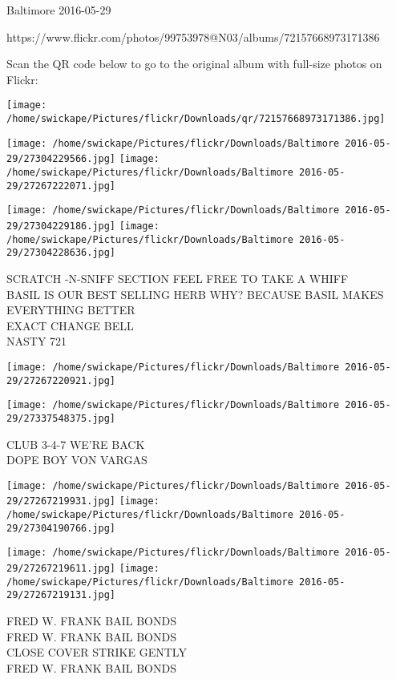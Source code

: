 \documentclass[10pt,letterpaper]{article}
\begin{document}
Baltimore 2016-05-29

https://www.flickr.com/photos/99753978@N03/albums/72157668973171386

Scan the QR code below to go to the original album with full-size photos on Flickr:

\texttt{[image: /home/swickape/Pictures/flickr/Downloads/qr/72157668973171386.jpg]}
\pagebreak

\texttt{[image: /home/swickape/Pictures/flickr/Downloads/Baltimore 2016-05-29/27304229566.jpg]}
\texttt{[image: /home/swickape/Pictures/flickr/Downloads/Baltimore 2016-05-29/27267222071.jpg]}

\texttt{[image: /home/swickape/Pictures/flickr/Downloads/Baltimore 2016-05-29/27304229186.jpg]}
\texttt{[image: /home/swickape/Pictures/flickr/Downloads/Baltimore 2016-05-29/27304228636.jpg]}

SCRATCH {-}N{-}SNIFF SECTION FEEL FREE TO TAKE A WHIFF\\
BASIL IS OUR BEST SELLING HERB WHY?  BECAUSE BASIL MAKES EVERYTHING BETTER\\
EXACT CHANGE BELL\\
NASTY 721
\pagebreak

\texttt{[image: /home/swickape/Pictures/flickr/Downloads/Baltimore 2016-05-29/27267220921.jpg]}

\vspace{0.25in}
\texttt{[image: /home/swickape/Pictures/flickr/Downloads/Baltimore 2016-05-29/27337548375.jpg]}

CLUB 3{-}4{-}7 WE'RE BACK\\
DOPE BOY VON VARGAS
\pagebreak

\texttt{[image: /home/swickape/Pictures/flickr/Downloads/Baltimore 2016-05-29/27267219931.jpg]}
\texttt{[image: /home/swickape/Pictures/flickr/Downloads/Baltimore 2016-05-29/27304190766.jpg]}

\texttt{[image: /home/swickape/Pictures/flickr/Downloads/Baltimore 2016-05-29/27267219611.jpg]}
\texttt{[image: /home/swickape/Pictures/flickr/Downloads/Baltimore 2016-05-29/27267219131.jpg]}

FRED W. FRANK BAIL BONDS\\
FRED W. FRANK BAIL BONDS\\
CLOSE COVER STRIKE GENTLY\\
FRED W. FRANK BAIL BONDS
\pagebreak
\end{document}
